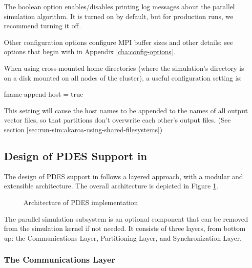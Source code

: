 The  boolean option enables/disables printing
log messages about the parallel simulation algorithm. It is turned on
by default, but for production runs, we recommend turning it off.

Other configuration options configure MPI buffer sizes and other details;
see options that begin with  in Appendix \ref{cha:config-options}.


When using cross-mounted home directories (where the simulation's
directory is on a disk mounted on all nodes of the cluster),
a useful configuration setting is:

\begin{inifile}
[General]
fname-append-host = true
\end{inifile}

This setting will cause the host names to be appended to the names of
all output vector files, so that partitions don't overwrite each other's
output files. (See section \ref{sec:run-sim:akaroa-using-shared-filesystems})





\subsection{Design of PDES Support in {\opp}}
\label{sec:parallel-exec:design-of-pdes-support}

The design of PDES support in {\opp} follows a layered approach,
with a modular and extensible architecture. The overall
architecture is depicted in Figure \ref{fig:parsim-arch}.

\begin{figure}[htbp]
  \begin{center}
    
    \caption{Architecture of {\opp} PDES implementation}
    \label{fig:parsim-arch}
  \end{center}
\end{figure}

The parallel simulation subsystem is an optional component
that can be removed from the simulation kernel
if not needed. It consists of three layers, from bottom up:
the Communications Layer, Partitioning Layer, and Synchronization Layer.

\subsubsection{The Communications Layer}
\label{sec:parallel-exec:communications-layer}

